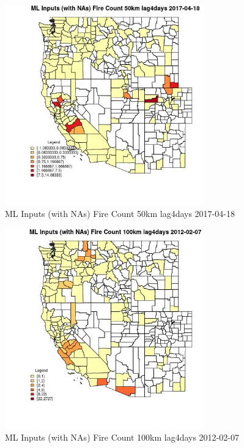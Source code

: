 \begin{figure} 
\centering  
\includegraphics[width=0.77\textwidth]{Code_Outputs/Report_ML_input_PM25_Step4_part_f_de_duplicated_aveswNAs_CountyFire_Count_50km_lag4daysMean2017-04-18.jpg} 
\caption{\label{fig:Report_ML_input_PM25_Step4_part_f_de_duplicated_aveswNAsCountyFire_Count_50km_lag4daysMean2017-04-18}ML Inputs (with NAs) Fire Count 50km lag4days 2017-04-18} 
\end{figure} 
 

\begin{figure} 
\centering  
\includegraphics[width=0.77\textwidth]{Code_Outputs/Report_ML_input_PM25_Step4_part_f_de_duplicated_aveswNAs_CountyFire_Count_100km_lag4daysMean2012-02-07.jpg} 
\caption{\label{fig:Report_ML_input_PM25_Step4_part_f_de_duplicated_aveswNAsCountyFire_Count_100km_lag4daysMean2012-02-07}ML Inputs (with NAs) Fire Count 100km lag4days 2012-02-07} 
\end{figure} 
 

